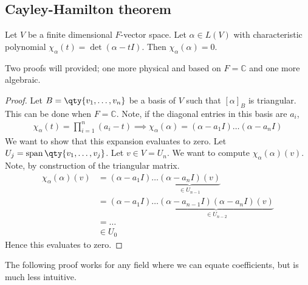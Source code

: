 \subsection{Cayley-Hamilton theorem}
\begin{theorem}
	Let $V$ be a finite dimensional $F$-vector space.
	Let $\alpha \in L(V)$ with characteristic polynomial $\chi_\alpha(t) = \det(\alpha - t I)$.
	Then $\chi_\alpha(\alpha) = 0$.
\end{theorem}
\noindent Two proofs will provided; one more physical and based on $F = \mathbb C$ and one more algebraic.
\begin{proof}
	Let $B = \qty{v_1, \dots, v_n}$ be a basis of $V$ such that $[\alpha]_B$ is triangular.
	This can be done when $F = \mathbb C$.
	Note, if the diagonal entries in this basis are $a_i$,
	\begin{align*}
		\chi_\alpha(t) = \prod_{i=1}^n (a_i - t) \implies \chi_\alpha(\alpha) = (\alpha - a_1 I) \dots (\alpha - a_n I)
	\end{align*}
	We want to show that this expansion evaluates to zero.
	Let $U_j = \vecspan \qty{v_1, \dots, v_j}$.
	Let $v \in V = U_n$.
	We want to compute $\chi_\alpha(\alpha)(v)$.
	Note, by construction of the triangular matrix.
	\begin{align*}
		\chi_\alpha(\alpha)(v) & = (\alpha - a_1 I) \dots \underbrace{(\alpha - a_n I)(v)}_{\in U_{n-1}}                     \\
		                       & = (\alpha - a_1 I) \dots \underbrace{(\alpha - a_{n-1} I)(\alpha - a_n I)(v)}_{\in U_{n-2}} \\
		                       & = \dots                                                                                     \\
		                       & \in U_0
	\end{align*}
	Hence this evaluates to zero.
\end{proof}
\noindent The following proof works for any field where we can equate coefficients, but is much less intuitive.

